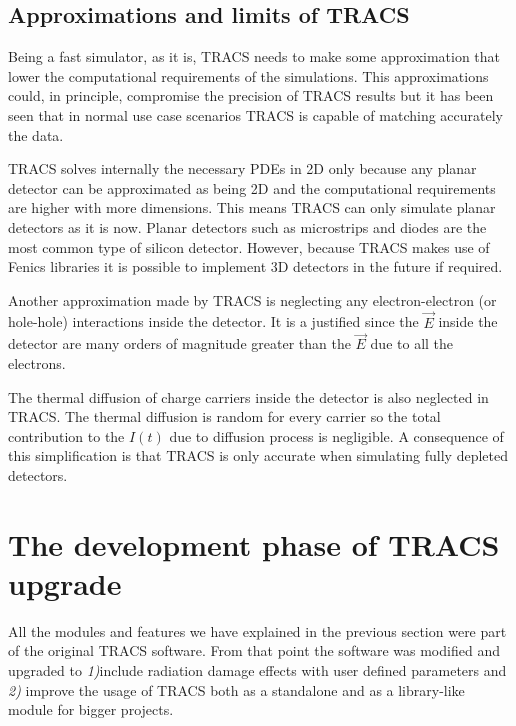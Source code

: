 \subsection{Approximations and limits of TRACS} %
\label{sec:approxTRACS}

Being a fast simulator, as it is, TRACS needs to make some approximation that lower the computational requirements of the simulations. This approximations could, in principle, compromise the precision of TRACS results but it has been seen that in normal use case scenarios TRACS is capable of matching accurately the data\cite{TRACSCompar}.
 
TRACS solves internally the necessary PDEs in 2D only because any planar detector can be approximated as being 2D and the computational requirements are higher with more dimensions. This means TRACS can only simulate planar detectors as it is now. Planar detectors such as microstrips and diodes are the most common type of silicon detector. However, because TRACS makes use of Fenics libraries it is possible to implement 3D detectors in the future if required.

Another approximation made by TRACS is neglecting any electron-electron (or hole-hole) interactions inside the detector. It is a justified since the $\overrightarrow E$ inside the detector are many orders of magnitude greater than the $\overrightarrow E$ due to all the electrons.

The thermal diffusion of charge carriers inside the detector is also neglected in TRACS. The thermal diffusion is random for every carrier so the total contribution to the $I(t)$ due to diffusion process is negligible. A consequence of this simplification is that TRACS is only accurate when simulating fully depleted detectors. 

\section{The development phase of TRACS upgrade} %
\label{sec:devTRACS}

All the modules and features we have explained in the previous section were part of the original TRACS software. From that point the software was modified and upgraded to \emph{1)}include radiation damage effects  with user defined parameters and \emph{2)} improve the usage of TRACS both as a standalone and as a library-like module for bigger projects.


